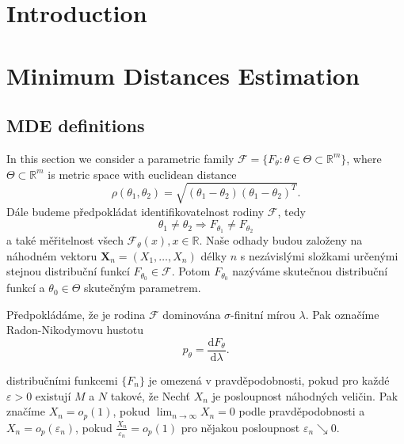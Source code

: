 \chapter*{Introduction}

\chapter{Minimum Distances Estimation}
	\section{MDE definitions}
	In this section we consider a parametric family $\mathcal{F} = \lbrace 
F_\theta : \theta \in \Theta \subset \mathbb{R}^m \rbrace$, where $\Theta 
\subset \mathbb{R}^m$ is metric space with euclidean distance 
\begin{equation}
	\rho (\theta_1,\theta_2) = \sqrt{(\theta_1-\theta_2)(\theta_1-\theta_2)^T}. 
\end{equation}
Dále budeme předpokládat identifikovatelnost rodiny $\mathcal{F}$, tedy 
\begin{equation}
\theta_1 \neq \theta_2 \Rightarrow F_{\theta_1} \neq F_{\theta_2}
\end{equation}
a také měřitelnost všech $\mathcal{F}_\theta(x), x \in \mathbb{R}$. Naše odhady 
budou založeny na náhodném vektoru $\mathbf{X}_n = (X_1, \ldots ,X_n)$ délky $n$ 
s nezávislými složkami určenými stejnou distribuční funkcí $F_{\theta_0} \in 
\mathcal{F}$. Potom $F_{\theta_0}$ nazýváme skutečnou distribuční funkcí a 
$\theta_0 \in \Theta$ skutečným parametrem. 

Předpokládáme, že je rodina $\mathcal{F}$ dominována $\sigma$-finitní mírou 
$\lambda$. Pak označíme Radon-Nikodymovu hustotu 
\begin{equation}
p_\theta = \dfrac{\mathrm{d} F_\theta}{\mathrm{d} \lambda}.
\end{equation}



\begin{definition}
distribučními funkcemi $\lbrace F_n \rbrace$ je omezená v pravděpodobnosti, 
pokud pro každé $\varepsilon > 0 $ existují $M$ a $N$ takové, že 
	Nech\v{t} $X_n$ je posloupnost náhodných veličin. Pak značíme $X_n = o_p(1)$, 
pokud $\lim_{n \rightarrow \infty } X_n = 0$ podle pravděpodobnosti a $X_n = 
o_p(\varepsilon_n)$, pokud $\frac{X_n}{\varepsilon_n} = o_p(1)$ pro nějakou 
posloupnost $\varepsilon_n \searrow 0$.
\end{definition} 

